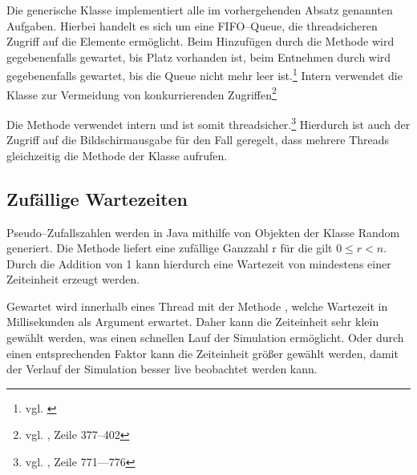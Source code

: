 Die generische Klasse  implementiert alle im vorhergehenden Absatz genannten Aufgaben. Hierbei handelt es sich um eine FIFO–Queue, die threadsicheren Zugriff auf die Elemente ermöglicht. Beim Hinzufügen durch die Methode  wird gegebenenfalls gewartet, bis Platz vorhanden ist, beim Entnehmen durch  wird gegebenenfalls gewartet, bis die Queue nicht mehr leer ist.\footnote{vgl. \cite{javadoc:lbq}} Intern verwendet die Klasse  zur Vermeidung von konkurrierenden Zugriffen\footnote{vgl. \cite{javadoc:lbqsource}, Zeile 377–402}

Die Methode  verwendet intern  und ist somit threadsicher.\footnote{vgl. \cite{javadoc:println}, Zeile 771—776} Hierdurch ist auch der Zugriff auf die Bildschirmausgabe für den Fall geregelt, dass mehrere Threads gleichzeitig die Methode  der Klasse  aufrufen.

\subsection{Zufällige Wartezeiten} %
\label{sub:zufall}
Pseudo–Zufallszahlen werden in Java mithilfe von Objekten der Klasse Random generiert. Die Methode  liefert eine zufällige Ganzzahl r für die gilt $0 \leq r < n$. Durch die Addition von 1 kann hierdurch eine Wartezeit von mindestens einer Zeiteinheit erzeugt werden.

Gewartet wird innerhalb eines Thread mit der Methode , welche Wartezeit in Millisekunden als Argument erwartet. Daher kann die Zeiteinheit sehr klein gewählt werden, was einen schnellen Lauf der Simulation ermöglicht. Oder durch einen entsprechenden Faktor kann die Zeiteinheit größer gewählt werden, damit der Verlauf der Simulation besser live beobachtet werden kann.


